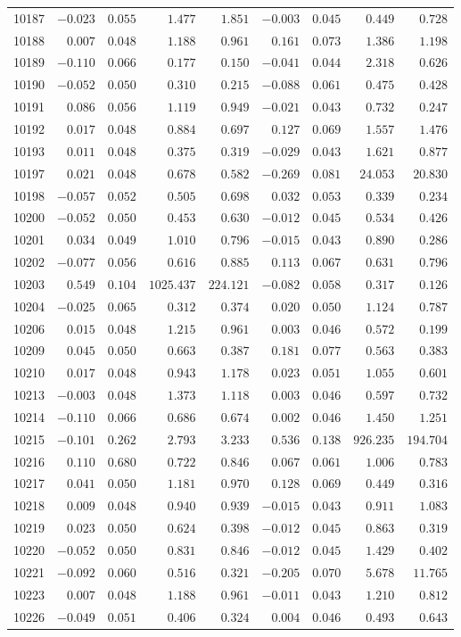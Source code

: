 {\begin{longtable}{l|rrrr|rrrr}
10187&$-0.023$&$0.055$&$   1.477$&$  1.851$&$-0.003$&$0.045$&$  0.449$&$  0.728$\tabularnewline
10188&$ 0.007$&$0.048$&$   1.188$&$  0.961$&$ 0.161$&$0.073$&$  1.386$&$  1.198$\tabularnewline
10189&$-0.110$&$0.066$&$   0.177$&$  0.150$&$-0.041$&$0.044$&$  2.318$&$  0.626$\tabularnewline
10190&$-0.052$&$0.050$&$   0.310$&$  0.215$&$-0.088$&$0.061$&$  0.475$&$  0.428$\tabularnewline
10191&$ 0.086$&$0.056$&$   1.119$&$  0.949$&$-0.021$&$0.043$&$  0.732$&$  0.247$\tabularnewline
10192&$ 0.017$&$0.048$&$   0.884$&$  0.697$&$ 0.127$&$0.069$&$  1.557$&$  1.476$\tabularnewline
10193&$ 0.011$&$0.048$&$   0.375$&$  0.319$&$-0.029$&$0.043$&$  1.621$&$  0.877$\tabularnewline
10197&$ 0.021$&$0.048$&$   0.678$&$  0.582$&$-0.269$&$0.081$&$ 24.053$&$ 20.830$\tabularnewline
10198&$-0.057$&$0.052$&$   0.505$&$  0.698$&$ 0.032$&$0.053$&$  0.339$&$  0.234$\tabularnewline
10200&$-0.052$&$0.050$&$   0.453$&$  0.630$&$-0.012$&$0.045$&$  0.534$&$  0.426$\tabularnewline
10201&$ 0.034$&$0.049$&$   1.010$&$  0.796$&$-0.015$&$0.043$&$  0.890$&$  0.286$\tabularnewline
10202&$-0.077$&$0.056$&$   0.616$&$  0.885$&$ 0.113$&$0.067$&$  0.631$&$  0.796$\tabularnewline
10203&$ 0.549$&$0.104$&$1025.437$&$224.121$&$-0.082$&$0.058$&$  0.317$&$  0.126$\tabularnewline
10204&$-0.025$&$0.065$&$   0.312$&$  0.374$&$ 0.020$&$0.050$&$  1.124$&$  0.787$\tabularnewline
10206&$ 0.015$&$0.048$&$   1.215$&$  0.961$&$ 0.003$&$0.046$&$  0.572$&$  0.199$\tabularnewline
10209&$ 0.045$&$0.050$&$   0.663$&$  0.387$&$ 0.181$&$0.077$&$  0.563$&$  0.383$\tabularnewline
10210&$ 0.017$&$0.048$&$   0.943$&$  1.178$&$ 0.023$&$0.051$&$  1.055$&$  0.601$\tabularnewline
10213&$-0.003$&$0.048$&$   1.373$&$  1.118$&$ 0.003$&$0.046$&$  0.597$&$  0.732$\tabularnewline
10214&$-0.110$&$0.066$&$   0.686$&$  0.674$&$ 0.002$&$0.046$&$  1.450$&$  1.251$\tabularnewline
10215&$-0.101$&$0.262$&$   2.793$&$  3.233$&$ 0.536$&$0.138$&$926.235$&$194.704$\tabularnewline
10216&$ 0.110$&$0.680$&$   0.722$&$  0.846$&$ 0.067$&$0.061$&$  1.006$&$  0.783$\tabularnewline
10217&$ 0.041$&$0.050$&$   1.181$&$  0.970$&$ 0.128$&$0.069$&$  0.449$&$  0.316$\tabularnewline
10218&$ 0.009$&$0.048$&$   0.940$&$  0.939$&$-0.015$&$0.043$&$  0.911$&$  1.083$\tabularnewline
10219&$ 0.023$&$0.050$&$   0.624$&$  0.398$&$-0.012$&$0.045$&$  0.863$&$  0.319$\tabularnewline
10220&$-0.052$&$0.050$&$   0.831$&$  0.846$&$-0.012$&$0.045$&$  1.429$&$  0.402$\tabularnewline
10221&$-0.092$&$0.060$&$   0.516$&$  0.321$&$-0.205$&$0.070$&$  5.678$&$ 11.765$\tabularnewline
10223&$ 0.007$&$0.048$&$   1.188$&$  0.961$&$-0.011$&$0.043$&$  1.210$&$  0.812$\tabularnewline
10226&$-0.049$&$0.051$&$   0.406$&$  0.324$&$ 0.004$&$0.046$&$  0.493$&$  0.643$\tabularnewline

\end{longtable}}
